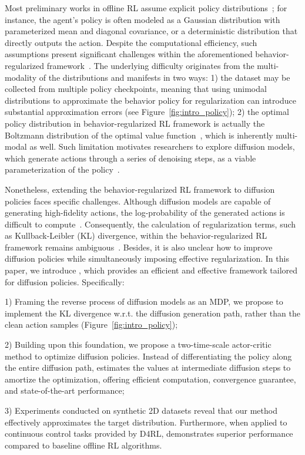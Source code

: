 Most preliminary works in offline RL assume explicit policy distributions~\citep{td3bc,sac,sacd}; for instance, the agent's policy is often modeled as a Gaussian distribution with parameterized mean and diagonal covariance, or a deterministic distribution that directly outputs the action. Despite the computational efficiency, such assumptions present significant challenges within the aforementioned behavior-regularized framework~\citep{dql,idql,sfbc}. The underlying difficulty originates from the multi-modality of the distributions and manifests in two ways: 1) the dataset may be collected from multiple policy checkpoints, meaning that using unimodal distributions to approximate the behavior policy for regularization can introduce substantial approximation errors (see Figure~\ref{fig:intro_policy}); 2) the optimal policy distribution in behavior-regularized RL framework is actually the Boltzmann distribution of the optimal value function~\cite{sql,awac}, which is inherently multi-modal as well. Such limitation motivates researchers to explore diffusion models, which generate actions through a series of denoising steps, as a viable parameterization of the policy~\citep{dql,idql,srpo,dtql,dac,zhang2024entropy}. 

Nonetheless, extending the behavior-regularized RL framework to diffusion policies faces specific challenges. Although diffusion models are capable of generating high-fidelity actions, the log-probability of the generated actions is difficult to compute~\citep{diffusion_sde}. Consequently, the calculation of regularization terms, such as Kullback-Leibler (KL) divergence, within the behavior-regularized RL framework remains ambiguous~\citep{zhang2024entropy,wang2024diffusion}. Besides, it is also unclear how to improve diffusion policies while simultaneously imposing effective regularization. In this paper, we introduce \algbb, which provides an efficient and effective framework tailored for diffusion policies. Specifically:

1) Framing the reverse process of diffusion models as an MDP, we propose to implement the KL divergence w.r.t. the diffusion generation path, rather than the clean action samples (Figure~\ref{fig:intro_policy}); 

2) Building upon this foundation, we propose a two-time-scale actor-critic method to optimize diffusion policies.  Instead of differentiating the policy along the entire diffusion path, \algbb estimates the values at intermediate diffusion steps to amortize the optimization, offering efficient computation, convergence guarantee, and state-of-the-art performance;

3) Experiments conducted on synthetic 2D datasets reveal that our method effectively approximates the target distribution. Furthermore, when applied to continuous control tasks provided by D4RL, \algbb demonstrates superior performance compared to baseline offline RL algorithms. 


